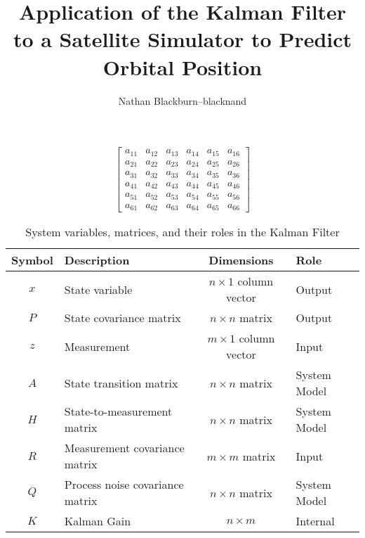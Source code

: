 \documentclass{article}
\begin{document}
\title{Application of the Kalman Filter to a Satellite Simulator to Predict Orbital Position}
\author{Nathan Blackburn--blacknand}
\maketitle

\[
\begin{bmatrix}
a_{11} & a_{12} & a_{13} & a_{14} & a_{15} & a_{16} \\
a_{21} & a_{22} & a_{23} & a_{24} & a_{25} & a_{26} \\
a_{31} & a_{32} & a_{33} & a_{34} & a_{35} & a_{36} \\
a_{41} & a_{42} & a_{43} & a_{44} & a_{45} & a_{46} \\
a_{51} & a_{52} & a_{53} & a_{54} & a_{55} & a_{56} \\
a_{61} & a_{62} & a_{63} & a_{64} & a_{65} & a_{66}
\end{bmatrix}
\]

\begin{table}[h!]
    \centering
    \begin{tabular}{|c|p{4cm}|c|p{6cm}|}
        \hline
        \textbf{Symbol} & \textbf{Description} & \textbf{Dimensions} & \textbf{Role} \\
        \hline
        \( x \) & State variable & \( n \times 1 \) column vector & Output \\
        \hline
        \( P \) & State covariance matrix & \( n \times n \) matrix & Output \\
        \hline
        \( z \) & Measurement & \( m \times 1 \) column vector & Input \\
        \hline
        \( A \) & State transition matrix & \( n \times n \) matrix & System Model \\
        \hline
        \( H \) & State-to-measurement matrix & \( n \times n \) matrix & System Model \\
        \hline
        \( R \) & Measurement covariance matrix & \( m \times m \) matrix & Input \\
        \hline
        \( Q \) & Process noise covariance matrix & \( n \times n \) matrix & System Model \\
        \hline
        \( K \) & Kalman Gain & \( n \times m \) & Internal \\
        \hline
    \end{tabular}
    \caption{System variables, matrices, and their roles in the Kalman Filter}
    \label{tab:kalman_variables}
\end{table}
\end{document}
